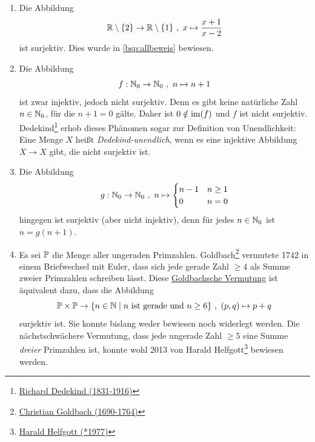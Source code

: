 \begin{bsp} \label{bsp:surjektiv} \quad
    \begin{enumerate}
        \item Die Abbildung
            \[ \mathbb R \setminus \{2\} \to \mathbb R \setminus \{1\} \ ,\ x \mapsto \frac{x+1}{x-2} \]
        ist surjektiv. Dies wurde in \cref{bsp:allbeweis} bewiesen.
        \item Die Abbildung
            \[ f:\mathbb N_0 \to \mathbb N_0 \ ,\ n \mapsto n+1 \]
        ist zwar injektiv, jedoch nicht surjektiv. Denn es gibt keine natürliche Zahl $n\in \mathbb N_0$, für die $n+1=0$ gälte. Daher ist $0\notin \operatorname{im}(f)$ und $f$ ist nicht surjektiv. Dedekind\footnote{\href{https://de.wikipedia.org/wiki/Richard_Dedekind}{Richard Dedekind (1831-1916)}} erhob dieses Phänomen sogar zur Definition von Unendlichkeit: Eine Menge $X$ heißt \emph{Dedekind-unendlich}, wenn es eine injektive Abbildung $X\to X$ gibt, die nicht surjektiv ist.
        \item Die Abbildung
            \[ g: \mathbb N_0 \to \mathbb N_0\ ,\ n \mapsto \begin{cases}
                n-1 & n\ge 1 \\
                0 & n=0
            \end{cases}\]
        hingegen ist surjektiv (aber nicht injektiv), denn für jedes $n \in \mathbb N_0$ ist $n=g(n+1)$.
        \item Es sei $\mathbb P$ die Menge aller ungeraden Primzahlen. Goldbach\footnote{\href{https://de.wikipedia.org/wiki/Christian_Goldbach}{Christian Goldbach (1690-1764)}} vermutete 1742 in einem Briefwechsel mit Euler, dass sich jede gerade Zahl $\ge 4$ als Summe zweier Primzahlen schreiben lässt. Diese \href{https://de.wikipedia.org/wiki/Goldbachsche_Vermutung}{Goldbachsche Vermutung} ist äquivalent dazu, dass die Abbildung
            \[ \mathbb P \times \mathbb P \to \{n\in \mathbb N \mid n\ \text{ist gerade und}\ n\ge 6\} \ ,\ (p,q) \mapsto p+q \]
        surjektiv ist. Sie konnte bislang weder bewiesen noch widerlegt werden. Die nächstschwächere Vermutung, dass jede ungerade Zahl $\ge 5$ eine Summe \emph{dreier} Primzahlen ist, konnte wohl 2013 von Harald Helfgott\footnote{\href{https://de.wikipedia.org/wiki/Harald_Helfgott}{Harald Helfgott (*1977)}} bewiesen werden.
    \end{enumerate}
\end{bsp}


